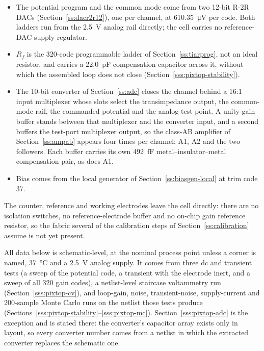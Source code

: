 \begin{itemize}[nosep]
  \item The potential program and the common mode come from two 12-bit R-2R
    DACs (Section~\ref{ss:dacr2r12}), one per channel, at
    \SI{610.35}{\micro\volt} per code. Both ladders run from the
    \SI{2.5}{\volt} analog rail directly; the cell carries no reference-DAC
    supply regulator.
  \item \(R_f\) is the 320-code programmable ladder of
    Section~\ref{ss:tiarprog}, not an ideal resistor, and carries a
    \SI{22.0}{\pico\farad} compensation capacitor across it, without which the
    assembled loop does not close (Section~\ref{sss:pixtop-stability}).
  \item The 10-bit converter of Section~\ref{ss:adc} closes the channel behind
    a 16:1 input multiplexer whose slots select the transimpedance output, the
    common-mode rail, the commanded potential and the analog test point. A
    unity-gain buffer stands between that multiplexer and the converter input,
    and a second buffers the test-port multiplexer output, so the class-AB
    amplifier of Section~\ref{ss:ampab} appears four times per channel: A1, A2
    and the two followers. Each buffer carries its own
    \SI{492}{\femto\farad} metal--insulator--metal compensation pair, as does
    A1.
  \item Bias comes from the local generator of Section~\ref{ss:biasgen-local}
    at trim code 37.
\end{itemize}

The counter, reference and working electrodes leave the cell directly: there
are no isolation switches, no reference-electrode buffer and no on-chip gain
reference resistor, so the fabric several of the calibration steps of
Section~\ref{ss:calibration} assume is not yet present.

All data below is schematic-level, at the nominal process point unless a corner
is named, \SI{37}{\celsius} and a \SI{2.5}{\volt} analog supply. It comes from
three dc and transient tests (a sweep of the potential code, a transient with
the electrode inert, and a sweep of all 320 gain codes), a netlist-level
staircase voltammetry run (Section~\ref{sss:pixtop-cv}), and loop-gain, noise,
transient-noise, supply-current and 200-sample Monte Carlo runs on the netlist
those tests produce
(Sections~\ref{sss:pixtop-stability}--\ref{sss:pixtop-mc}).
Section~\ref{sss:pixtop-adc} is the exception and is stated there: the
converter's capacitor array exists only in layout, so every converter number
comes from a netlist in which the extracted converter replaces the schematic
one.
